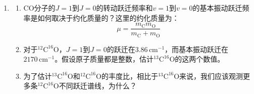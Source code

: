 \documentclass[a4paper]{article}
\begin{document}
\begin{enumerate}
    参考文献：\url{https://www.aanda.org/articles/aa/pdf/2010/10/aa14589-10.pdf}

    \bigskip
    \item[6.]
    \begin{enumerate}
        \item[(a)] $\mathrm{CO}$分子的$J=1$到$J=0$的转动跃迁频率和$v=1$到$v=0$的基本振动跃迁频率是如何取决于约化质量的？这里的约化质量为：
        \[
            \mu = \frac{m_{\mathrm{C}}m_{\mathrm{O}}}{m_{\mathrm{C}}+m_{\mathrm{O}}}
        \]

        \item[(b)] 对于$\mathrm{^{12}C^{16}O}$，$J=1$到$J=0$的跃迁在$3.86\,\mathrm{cm}^{−1}$，而基本振动跃迁在$2170\,\mathrm{cm}^{−1}$。假设原子质量都是整数，估计$\mathrm{^{13}C^{16}O}$的这两个数值。
        
        \item[(c)] 为了估计$\mathrm{^{13}C^{16}O}$和$\mathrm{^{12}C^{16}O}$的丰度比，相比于$\mathrm{^{13}C^{16}O}$来说，我们应该观测更多条$\mathrm{^{12}C^{16}O}$不同跃迁谱线，为什么？
    \end{enumerate}
\end{enumerate}
\end{document}
